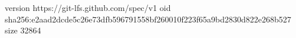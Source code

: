version https://git-lfs.github.com/spec/v1
oid sha256:e2aad2dcde5c26e73dfb596791558bf260010f223f65a9bd2830d822e268b527
size 32864
